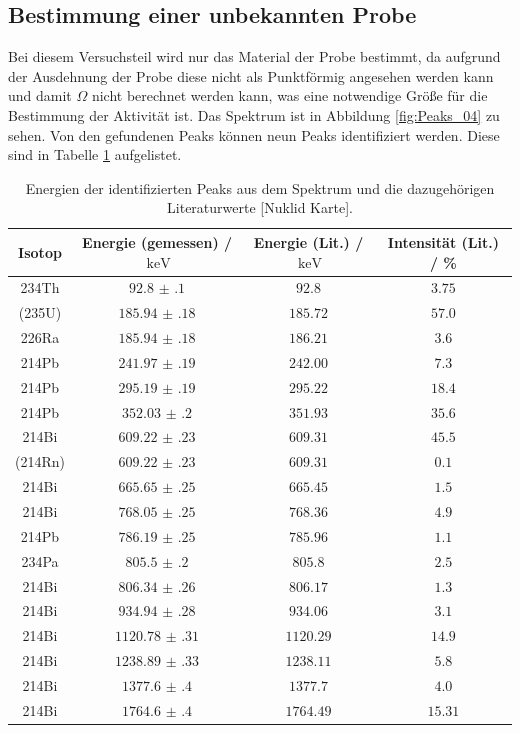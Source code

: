 \subsection{Bestimmung einer unbekannten Probe}
Bei diesem Versuchsteil wird nur  das Material der Probe bestimmt, da aufgrund der Ausdehnung der Probe diese nicht als Punktförmig 
angesehen werden kann und damit $\Omega$ nicht berechnet werden kann, was eine notwendige Größe für die Bestimmung der Aktivität ist.
Das Spektrum ist in Abbildung \ref{fig:Peaks_04} zu sehen.
Von den gefundenen Peaks können neun Peaks identifiziert werden. Diese sind in Tabelle \ref{tab:ident_Peaks} 
aufgelistet.
\FloatBarrier
\begin{table}
  \centering
  \caption{Energien der identifizierten Peaks aus dem Spektrum und die dazugehörigen Literaturwerte \cite{}[Nuklid Karte].}
  \label{tab:ident_Peaks}
  \begin{tabular}{c c c c}
    \midrule
    Isotop& Energie (gemessen) / $\SI{}{\kilo\eV}$&  Energie (Lit.) / $\SI{}{\kilo\eV}$& Intensität (Lit.) / \%\\
    \midrule
    234Th&$\num{92.8(1)}$&$\num{92.8}$&$\num{3.75}$\\
    (235U)&$\num{185.94(18)}$&$\num{185.72}$&$\num{57.0}$\\
    226Ra&$\num{185.94(18)}$&$\num{186.21}$&$\num{3.6}$\\
    214Pb&$\num{241.97(19)}$&$\num{242.00}$&$\num{7.3}$\\
    214Pb&$\num{295.19(19)}$&$\num{295.22}$&$\num{18.4}$\\
    214Pb&$\num{352.03(20)}$&$\num{351.93}$&$\num{35.6}$\\
    214Bi&$\num{609.22(23)}$&$\num{609.31}$&$\num{45.5}$\\
    (214Rn)&$\num{609.22(23)}$&$\num{609.31}$&$\num{0.1}$\\
    214Bi&$\num{665.65(25)}$&$\num{665.45}$&$\num{1.5}$\\
    214Bi&$\num{768.05(25)}$&$\num{768.36}$&$\num{4.9}$\\
    214Pb&$\num{786.19(25)}$&$\num{785.96}$&$\num{1.1}$\\
    234Pa&$\num{805.5(2)}$&$\num{805.8}$&$\num{2.5}$\\
    214Bi&$\num{806.34(26)}$&$\num{806.17}$&$\num{1.3}$\\
    214Bi&$\num{934.94(28)}$&$\num{934.06}$&$\num{3.1}$\\
    214Bi&$\num{1120.78(31)}$&$\num{1120.29}$&$\num{14.9}$\\
    214Bi&$\num{1238.89(33)}$&$\num{1238.11}$&$\num{5.8}$\\
    214Bi&$\num{1377.6(4)}$&$\num{1377.7}$&$\num{4.0}$\\
    214Bi&$\num{1764.6(4)}$&$\num{1764.49}$&$\num{15.31}$\\
    \bottomrule
  \end{tabular}
\end{table}
